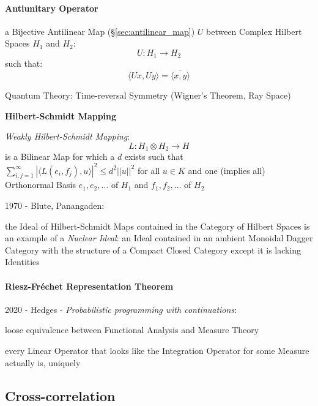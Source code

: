 \paragraph{Antiunitary Operator}\label{sec:antiunitary_operator}\hfill

a Bijective Antilinear Map (\S\ref{sec:antilinear_map}) $U$ between Complex
Hilbert Spaces $H_1$ and $H_2$:
\[
  U : H_1 \rightarrow H_2
\]
such that:
\[
  \langle{Ux,Uy}\rangle = \overline{\langle{x,y}\rangle}
\]

Quantum Theory: Time-reversal Symmetry (Wigner's Theorem, Ray Space) %



\textbf{Hilbert-Schmidt Mapping}

\emph{Weakly Hilbert-Schmidt Mapping}:
\[
  L : H_1 \otimes H_2 \rightarrow H
\]
is a Bilinear Map for which a $d$ exists such that
$\sum_{i,j=1}^\infty | \langle L(e_i,f_j), u \rangle |^2 \leq d^2
||u||^2$ for all $u \in K$ and one (implies all) Orthonormal Basis
$e_1, e_2, \ldots$ of $H_1$ and $f_1, f_2, \ldots$ of $H_2$


1970 - Blute, Panangaden:

the Ideal of Hilbert-Schmidt Maps contained in the Category of Hilbert
Spaces is an example of a \emph{Nuclear Ideal}: an Ideal contained in
an ambient Monoidal Dagger Category with the structure of a Compact
Closed Category except it is lacking Identities



\paragraph{Riesz-Fr\'echet Representation Theorem}
\label{sec:riesz_representation}\hfill

2020 - Hedges - \emph{Probabilistic programming with continuations}:

loose equivalence between Functional Analysis and Measure Theory

every Linear Operator that looks like the Integration Operator for some Measure
actually is, uniquely



\subsection{Cross-correlation}\label{sec:cross_correlation}

